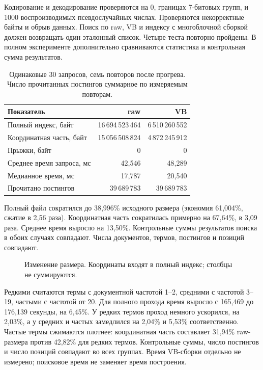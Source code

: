 \testing
Кодирование и декодирование проверяются на 0, границах 7-битовых
групп,  и 1000 воспроизводимых псевдослучайных числах.
Проверяются некорректные байты и обрыв данных. Поиск по raw, VB
и индексу с многоблочной сборкой должен возвращать один эталонный
список. Четыре теста повторно пройдены. В полном эксперименте
дополнительно сравниваются статистика и контрольная сумма результатов.

\results
\begin{table}[H]\centering
\begin{tabular}{lrr}\toprule
Показатель & raw & VB\\\midrule
Полный индекс, байт & 16\,694\,523\,464 & 6\,510\,260\,552\\
Координатная часть, байт & 15\,056\,508\,824 & 4\,872\,245\,912\\
Прыжки, байт & 0 & 0\\
Среднее время запроса, мс & 42,546 & 48,289\\
Медианное время, мс & 17,787 & 20,540\\
Прочитано постингов & 39\,689\,783 & 39\,689\,783\\\bottomrule
\end{tabular}
\caption{Одинаковые 30 запросов, семь повторов после прогрева. Число прочитанных постингов суммарное по измеряемым повторам.}
\end{table}
Полный файл сократился до 38,996\% исходного размера (экономия
61,004\%, сжатие в 2,56 раза). Координатная часть сократилась примерно
на 67,64\%, в 3,09 раза. Среднее время выросло на 13,50\%.
Контрольные суммы результатов поиска в обоих случаях совпадают.
Числа документов, термов, постингов и позиций совпадают.

\begin{figure}[H]\centering
{}
\caption{Изменение размера. Координаты входят в полный индекс; столбцы не суммируются.}
\end{figure}

Редкими считаются термы с документной частотой 1--2,
средними с частотой 3--19, частыми с частотой от 20.
Для полного прохода время выросло с 165,469 до 176,139 секунды,
на 6,45\%. У редких термов проход немного ускорился, на 2,03\%,
а у средних и частых замедлился на 2,04\% и 5,53\% соответственно.
Частые термы сжимаются плотнее: координатная часть составляет
31,94\% raw-размера против 42,82\% для редких термов.
Контрольные суммы, число постингов и число позиций совпадают
во всех группах. Время VB-сборки отдельно не измерено;
поисковое время не заменяет время построения.

